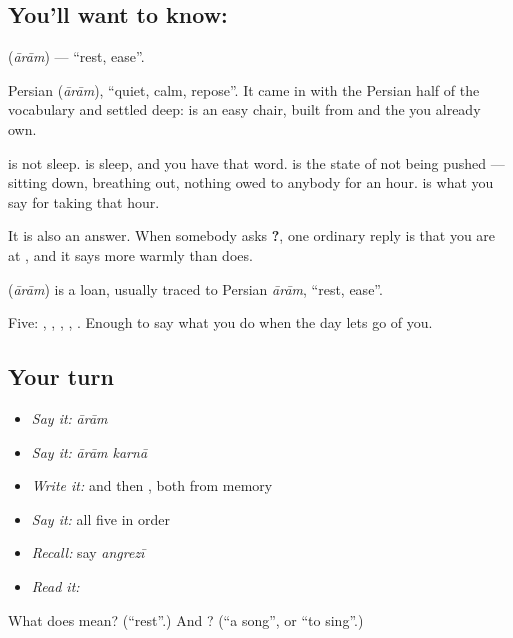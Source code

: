 \subsection*{You'll want to know: }
\textbf{} (\emph{ārām}) — \textquotedblleft{}rest, ease\textquotedblright{}.

Persian  (\emph{ārām}), \textquotedblleft{}quiet, calm, repose\textquotedblright{}. It came in with the Persian half of the vocabulary and settled deep: \textbf{} is an easy chair, built from  and the \textbf{} you already own.

 is not sleep. \textbf{} is sleep, and you have that word.  is the state of not being pushed — sitting down, breathing out, nothing owed to anybody for an hour. \textbf{ } is what you say for taking that hour.

It is also an answer. When somebody asks \textbf{  ?}, one ordinary reply is that you are at , and it says more warmly than \textbf{} does.

\begin{cousinweb}
\textbf{} (\emph{ārām}) is a loan, usually traced to Persian \emph{ārām}, \textquotedblleft{}rest, ease\textquotedblright{}.
\end{cousinweb}

\begin{grammarlens}[title={What you've built}]
Five: , , , , . Enough to say what you do when the day lets go of you.
\end{grammarlens}

\subsection*{Your turn}
\begin{itemize}
\raggedright
  \item \emph{Say it:} \emph{ārām}
  \item \emph{Say it:} \emph{ārām karnā}
  \item \emph{Write it:}  and then , both from memory
  \item \emph{Say it:} all five in order
  \item \emph{Recall:} say \emph{angrezī}
  \item \emph{Read it:} \textbf{}
\end{itemize}

\begin{tcolorbox}[breakable,colback=teal!4,colframe=teal!35!black,title={Before you move on}]
What does  mean? (\textquotedblleft{}rest\textquotedblright{}.) And ? (\textquotedblleft{}a song\textquotedblright{}, or \textquotedblleft{}to sing\textquotedblright{}.)
\end{tcolorbox}
